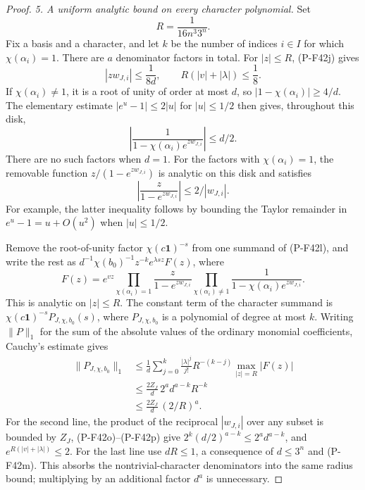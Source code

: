 \begin{proof}
\emph{5. A uniform analytic bound on every character polynomial.}
Set
\[
                      R=\frac1{16n^3 3^n}.
 \tag{P-F42m}
\]
Fix a basis and a character, and let $k$ be the number of
indices $i\in I$ for which $\chi(\alpha_i)=1$.
There are $a$ denominator factors in total.
For $|z|\le R$, (P-F42j) gives
\[
 |zw_{J,i}|\le\frac1{8d},\qquad
 R(|v|+|\lambda|)\le\frac18.
 \tag{P-F42n}
\]
If $\chi(\alpha_i)\ne1$, it is a root of unity of order at
most $d$, so
$|1-\chi(\alpha_i)|\ge4/d$.
The elementary estimate $|e^u-1|\le2|u|$ for $|u|\le1/2$
then gives, throughout this disk,
\[
 \left|\frac1{1-\chi(\alpha_i)e^{z w_{J,i}}}\right|
          \le d/2.
 \tag{P-F42o}
\]
There are no such factors when $d=1$.
For the factors with $\chi(\alpha_i)=1$, the removable
function $z/(1-e^{z w_{J,i}})$ is analytic on this disk and
satisfies
\[
 \left|\frac{z}{1-e^{z w_{J,i}}}\right|
            \le2/|w_{J,i}|.
 \tag{P-F42p}
\]
For example, the latter inequality follows by bounding the
Taylor remainder in $e^u-1=u+O(u^2)$ when $|u|\le1/2$.

Remove the root-of-unity factor $\chi(c\mathbf1)^{-s}$ from
one summand of (P-F42l), and write the rest as
$d^{-1}\chi(b_0)^{-1}z^{-k}e^{\lambda sz}F(z)$, where
\[
 F(z)=e^{vz}
 \prod_{\chi(\alpha_i)=1}
             \frac{z}{1-e^{z w_{J,i}}}
 \prod_{\chi(\alpha_i)\ne1}
             \frac1{1-\chi(\alpha_i)e^{z w_{J,i}}}.
\]
This is analytic on $|z|\le R$.
The constant term of the character summand is
$\chi(c\mathbf1)^{-s}P_{J,\chi,b_0}(s)$, where
$P_{J,\chi,b_0}$ is a polynomial of degree at most $k$.
Writing $\|P\|_1$ for the sum of the absolute values of
the ordinary monomial coefficients, Cauchy's estimate gives
\begin{align*}
 \|P_{J,\chi,b_0}\|_1
 &\le \frac1d
       \sum_{j=0}^k\frac{|\lambda|^j}{j!}
          R^{-(k-j)}\max_{|z|=R}|F(z)|\\
 &\le \frac{2Z_J}{d}\,2^a d^{a-k}R^{-k}\\
 &\le \frac{2Z_J}{d}\,(2/R)^a.
 \tag{P-F42q}
\end{align*}
For the second line, the product of the reciprocal
$|w_{J,i}|$ over any subset is bounded by $Z_J$,
(P-F42o)--(P-F42p) give
$2^k(d/2)^{a-k}\le2^a d^{a-k}$, and
$e^{R(|v|+|\lambda|)}\le2$.
For the last line use $dR\le1$, a consequence of
$d\le3^n$ and (P-F42m).
This absorbs the nontrivial-character denominators into
the same radius bound; multiplying by an additional
factor $d^a$ is unnecessary.


\end{proof}
